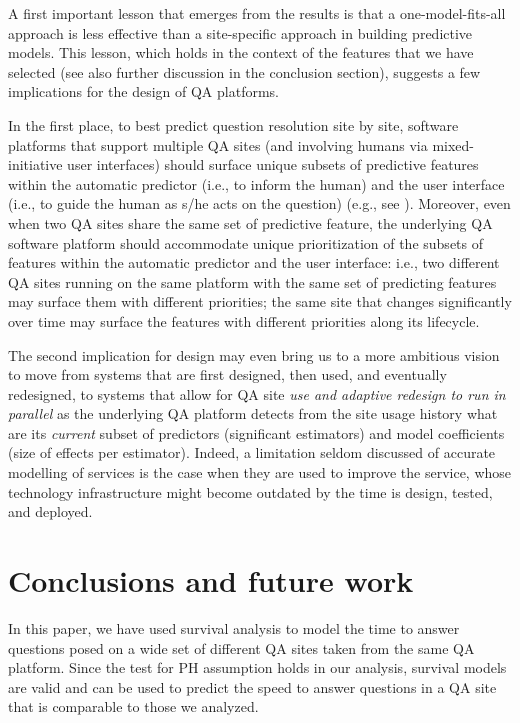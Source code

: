 \documentclass{chi2012}
\begin{document}
A first important lesson that emerges from the results is that a 
one-model-fits-all approach is less effective than a site-specific approach in building predictive models. This lesson, which holds in the context of the features that we have selected (see also further 
discussion in the conclusion section), suggests a few implications for the design of QA platforms.

In the first place, to best predict question resolution site by site, software platforms that support multiple QA sites (and involving humans via mixed-initiative user interfaces) should surface unique subsets of predictive features within the automatic predictor (i.e., to inform the human) and the user interface (i.e., to guide the human as s/he acts on the question) (e.g., see \cite{piccardi2014}).
Moreover, even when two QA sites share the same set of predictive feature, the underlying QA software platform should accommodate unique prioritization of the subsets of features within the automatic predictor and the user interface: i.e., two different QA sites running on the same platform with the same set of predicting features may surface them with different priorities; the same site that changes significantly over time may surface the features with different priorities along its lifecycle.

The second implication for design may even bring us to a more ambitious vision to move from systems that are first designed, then used, and eventually redesigned, to systems that allow for QA site \textit{use and adaptive redesign to run in parallel} as the underlying QA platform detects from the site usage history what are its \textit{current} subset of predictors (significant estimators) and model coefficients (size of effects per estimator).  Indeed, a limitation seldom discussed of accurate modelling of services is the case when they are used to improve 
the service, whose technology infrastructure might become outdated by the time is design, tested, and deployed.

\section{Conclusions and future work}

In this paper, we have used survival analysis to model the time to answer questions posed on a wide set of different QA sites taken from the same QA platform.  Since the test for PH assumption holds in our analysis, survival models are valid and can be used to predict 
the speed to answer questions in a QA site that is comparable to those we analyzed.
\end{document}
